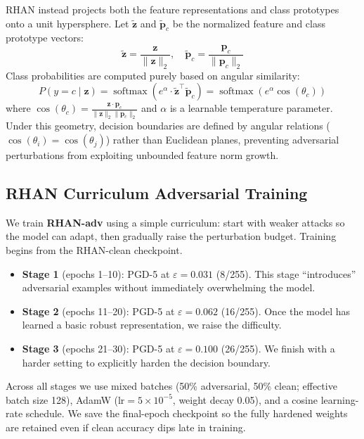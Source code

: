\documentclass[12pt,a4paper]{article}
\begin{document}
RHAN instead projects both the feature representations and class prototypes onto a unit hypersphere. Let $\tilde{\mathbf{z}}$ and $\tilde{\mathbf{p}}_c$ be the normalized feature and class prototype vectors:
\begin{equation}
  \tilde{\mathbf{z}} = \frac{\mathbf{z}}{\|\mathbf{z}\|_2}, \quad \tilde{\mathbf{p}}_c = \frac{\mathbf{p}_c}{\|\mathbf{p}_c\|_2}
\end{equation}
Class probabilities are computed purely based on angular similarity:
\begin{equation}
  P(y = c \mid \mathbf{z}) = \operatorname{softmax}\left( e^{\alpha} \cdot \tilde{\mathbf{z}}^\top \tilde{\mathbf{p}}_c \right) = \operatorname{softmax}\left( e^{\alpha} \cos(\theta_c) \right)
\end{equation}
where $\cos(\theta_c) = \frac{\mathbf{z} \cdot \mathbf{p}_c}{\|\mathbf{z}\|_2 \|\mathbf{p}_c\|_2}$ and $\alpha$ is a learnable temperature parameter. Under this geometry, decision boundaries are defined by angular relations ($\cos(\theta_i) = \cos(\theta_j)$) rather than Euclidean planes, preventing adversarial perturbations from exploiting unbounded feature norm growth.

\subsection{RHAN Curriculum Adversarial Training}

We train \textbf{RHAN-adv} using a simple curriculum: start with weaker attacks
so the model can adapt, then gradually raise the perturbation budget. Training
begins from the RHAN-clean checkpoint.

\begin{itemize}[leftmargin=1.5em]
  \item \textbf{Stage 1} (epochs 1--10): PGD-5 at $\varepsilon{=}0.031$ (8/255).
        This stage ``introduces'' adversarial examples without immediately
        overwhelming the model.
  \item \textbf{Stage 2} (epochs 11--20): PGD-5 at $\varepsilon{=}0.062$ (16/255).
        Once the model has learned a basic robust representation, we raise the
        difficulty.
  \item \textbf{Stage 3} (epochs 21--30): PGD-5 at $\varepsilon{=}0.100$ (26/255).
        We finish with a harder setting to explicitly harden the decision
        boundary.
\end{itemize}

Across all stages we use mixed batches (50\% adversarial, 50\% clean; effective
batch size 128), AdamW ($\text{lr}{=}5{\times}10^{-5}$, weight decay 0.05), and a
cosine learning-rate schedule. We save the final-epoch checkpoint so the fully
hardened weights are retained even if clean accuracy dips late in training.
\end{document}

